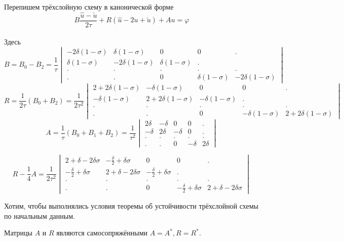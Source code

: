 \documentclass[12pt,a4paper]{article}
\begin{document}
Перепишем трёхслойную схему в канонической форме
$$B\frac{\hat{u} - \check{u}}{2\tau} + R(\hat{u} - 2u + \check{u}) + Au = \varphi$$\\

Здесь $$B = B_0 - B_2 = \frac{1}{\tau}\begin{vmatrix}
- 2\delta(1-\sigma) & \delta(1-\sigma) & 0 & 0&.\\
\delta(1-\sigma)  & - 2\delta(1-\sigma)& \delta(1-\sigma) &.\\
.&.&.&.&.\\
.&.&0&\delta(1-\sigma) & - 2\delta(1-\sigma)
\end{vmatrix}$$
$$R = \frac{1}{2\tau}(B_0 + B_2) = \frac{1}{2\tau^2} \begin{vmatrix}
2 + 2\delta(1-\sigma) & -\delta(1-\sigma) & 0 & 0&.\\
-\delta(1-\sigma)  & 2 + 2\delta(1-\sigma)& -\delta(1-\sigma) &.\\
.&.&.&.&.\\
.&.&0&-\delta(1-\sigma) & 2 + 2\delta(1-\sigma)
\end{vmatrix}
$$
$$A = \frac{1}{\tau}(B_0 + B_1 + B_2) = \frac{1}{\tau^2} \begin{vmatrix}
2\delta & -\delta& 0 & 0&.\\
-\delta & 2\delta & -\delta&0&.\\
.&.&.&.&.\\
.&.&0&-\delta & 2\delta
\end{vmatrix}
$$



 $$R - \frac{1}{4}A = \frac{1}{2\tau^2}\begin{vmatrix}
2 + \delta - 2\delta\sigma & -\frac{\delta}{2} + \delta\sigma & 0 & 0&.\\
-\frac{\delta}{2} + \delta \sigma & 2 + \delta - 2\delta\sigma  & -\frac{\delta}{2} + \delta\sigma & .\\
.&.&.&.&.\\
.&.&0&-\frac{\delta}{2} + \delta\sigma & 2 + \delta - 2\delta\sigma 
\end{vmatrix}$$


Хотим, чтобы выполнялись условия теоремы об устойчивости трёхслойной схемы по начальным данным.

Матрицы $A$ и $R$ являются самосопряжёнными $A=A^{*}, R=R^{*}$.
\end{document}
